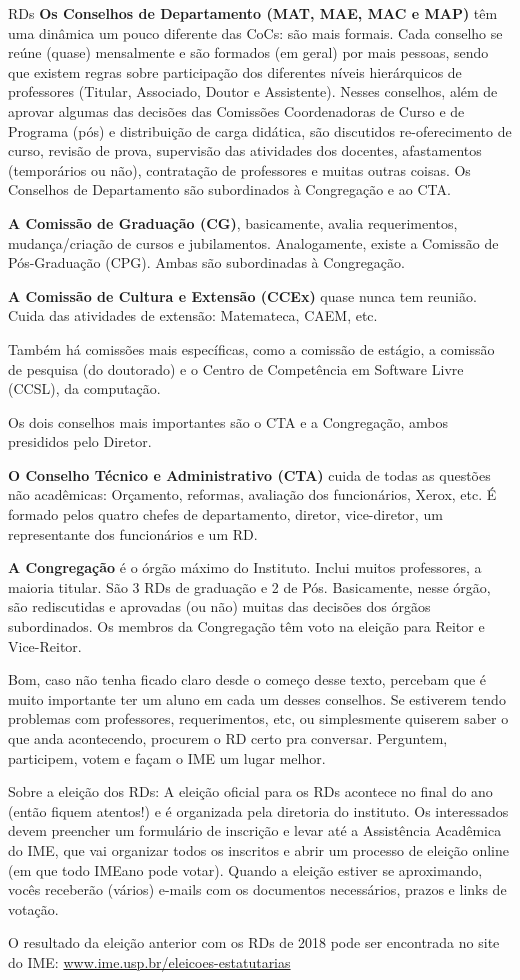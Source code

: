 \begin{subsecao}{RDs}
{\bf Os Conselhos de Departamento (MAT, MAE, MAC e MAP)} têm uma dinâmica um
pouco diferente das CoCs: são mais formais. Cada conselho se reúne (quase)
mensalmente e são formados (em geral) por mais pessoas, sendo que existem
regras sobre participação dos diferentes níveis hierárquicos de
professores (Titular, Associado, Doutor e Assistente). Nesses conselhos, além
de aprovar algumas das decisões das Comissões Coordenadoras de Curso e de
Programa (pós) e distribuição de carga didática, são discutidos re-oferecimento
de curso, revisão de prova, supervisão das atividades dos docentes,
afastamentos (temporários ou não), contratação de professores e muitas outras
coisas.
Os Conselhos de Departamento são subordinados à Congregação e ao CTA.

{\bf A Comissão de Graduação (CG)}, basicamente, avalia requerimentos,
mudança/criação de cursos e jubilamentos. Analogamente, existe a Comissão de
Pós-Graduação (CPG). Ambas são subordinadas à Congregação.

{\bf A Comissão de Cultura e Extensão (CCEx)} quase nunca tem reunião. Cuida
das atividades de extensão: Matemateca, CAEM, etc.

Também há comissões mais específicas, como a comissão de estágio, a comissão de
pesquisa (do doutorado) e o Centro de Competência em Software Livre (CCSL), da
computação.

Os dois conselhos mais importantes são o CTA e a Congregação, ambos presididos
pelo Diretor.

{\bf O Conselho Técnico e Administrativo (CTA)} cuida de todas as questões não
acadêmicas: Orçamento, reformas, avaliação dos funcionários, Xerox, etc. É
formado pelos quatro chefes de departamento, diretor, vice-diretor, um
representante dos funcionários e um RD.

{\bf A Congregação} é o órgão máximo do Instituto. Inclui muitos professores, a
maioria titular. São 3 RDs de graduação e 2 de Pós. Basicamente,
nesse órgão, são rediscutidas e aprovadas (ou não) muitas das decisões
dos órgãos subordinados. Os membros da Congregação têm voto na eleição para
Reitor e Vice-Reitor.

Bom, caso não tenha ficado claro desde o começo desse texto, percebam que é
muito importante ter um aluno em cada um desses conselhos. Se estiverem tendo
problemas com professores, requerimentos, etc, ou simplesmente quiserem saber
o que anda acontecendo, procurem o RD certo pra conversar. Perguntem,
participem, votem e façam o IME um lugar melhor.

Sobre a eleição dos RDs: A eleição oficial para os RDs acontece no final do ano
(então fiquem atentos!) e é organizada pela diretoria do instituto. Os
interessados devem preencher um formulário de inscrição e levar até a
Assistência Acadêmica do IME, que vai organizar todos os inscritos e abrir um
processo de eleição online (em que todo IMEano pode votar). Quando a eleição
estiver se aproximando, vocês receberão (vários) e-mails com os documentos
necessários, prazos e links de votação.

O resultado da eleição anterior com os RDs de 2018 pode ser encontrada no site
do IME:
\url{www.ime.usp.br/eleicoes-estatutarias}

\end{subsecao}
